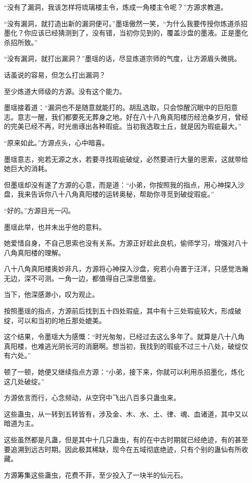 \begin{this_body}
“没有了漏洞，我该怎样将琉璃楼主令，炼成一角楼主令呢？”方源求教道。

“没有漏洞，就打造出新的漏洞便可。”墨瑶傲然一笑，“为什么我要传授你炼道杀招墨化？你应该已经猜测到了，没有错，当初你见到的，覆盖沙盘的墨液。正是墨化杀招所致。”

“没有漏洞，就打出漏洞？”墨瑶的话，尽显炼道宗师的气度，让方源眉头微挑。

话虽说的容易，但怎么打出漏洞？

至少炼道大师级的方源。没有这个能力。

墨瑶接着道：“漏洞也不是随意就能打的。胡乱选取，只会惊醒沉眠中的巨阳意志。意志一醒，我们都要死无葬身之地。好在八十八角真阳楼历经沧桑岁月，曾经的完美已经不再，时光凿琢出各种瑕疵。当初我选取土丘，就是因为瑕疵最大。”

“原来如此。”方源点头，心中暗喜。

墨瑶意志，宛若无源之水，若要寻找瑕疵破绽，必然要进行大量的思索，这就带给她巨大的消耗。

但墨瑶却没有遂了方源的心意，而是道：“小弟，你按照我的指点，用心神探入沙盘，我来告诉你八十八角真阳楼的运转奥秘，帮助你寻觅到破绽瑕疵。”

“好的。”方源目光一闪。

墨瑶此举，也并未出乎他的意料。

她爱惜自身，不自己思索也没有关系。方源正好趁此良机，偷师学习，增强对八十八角真阳楼的理解。

八十八角真阳楼奥妙非凡，方源将心神探入沙盘，宛若小舟置于汪洋，只感觉浩瀚无边，深不可测。一角一边，都值得自己深思借鉴。

当下，他深感渺小，叹为观止。

按照墨瑶的指点，方源前后找到五十四处瑕疵，其中有十三处瑕疵较大，形成破绽，可以和当初的地丘那处媲美。

这个结果，令墨瑶大为感慨：“时光匆匆，已经过去这么多年了。就算是八十八角真阳楼，也难逃光阴长河的消磨啊。想当初，我找到的瑕疵不过三十八处，破绽仅有六处。”

顿了一顿，她便又继续指点方源：“小弟，接下来，你就可以利用杀招墨化，炼化这几处破绽。”

方源依言而行，心念频动，从空窍中飞出八百多只蛊虫来。

这些蛊虫，从一转到五转皆有，涉及金、木、水、土、律、魂、血诸道，其中又以暗道为主。

这些虽然都是凡蛊，但是其中十几只蛊虫，有的在中古时期就已经绝迹，有的甚至要追溯到远古时期。因此极其稀缺，现今在五域彻底绝迹，只有个别的蛊仙有所收藏。

方源筹集这些蛊虫，花费不菲，至少投入了一块半的仙元石。


\end{this_body}
